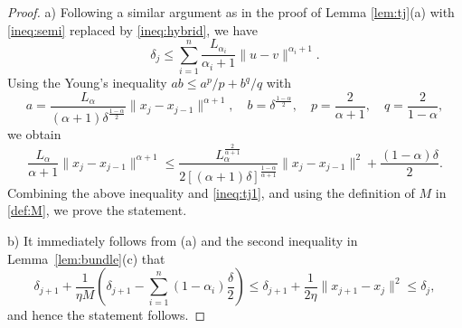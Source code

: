 \documentclass[11pt,letterpaper]{article}
\newtheorem{lemma}[thm]{Lemma}
\newcommand{\R}{\mathbb{R}}
\newcommand{\inner}[2]{\langle #1,#2\rangle}
\begin{document}
\begin{proof}
a) Following a similar argument as in the proof of Lemma \ref{lem:tj}(a) with \eqref{ineq:semi} replaced by \eqref{ineq:hybrid}, we have
\begin{equation}\label{ineq:tj1}
    \delta_j \le \sum_{i=1}^n \frac{L_{\alpha_i}}{\alpha_i+1} \|u-v\|^{\alpha_i+1}.
\end{equation}
Using the Young's inequality $ab\le a^p/p + b^q/q$ with 
	\[
	a = \frac{L_\alpha}{(\alpha+1)\delta^{\frac{1-\alpha}{2}}}\|x_j-x_{j-1}\|^{\alpha+1}, \quad b= \delta^{\frac{1-\alpha}{2}}, \quad p= \frac{2}{\alpha+1}, \quad q= \frac{2}{1-\alpha}, 
	\]
	we obtain
	\[
	\frac{L_\alpha}{\alpha+1}\|x_j-x_{j-1}\|^{\alpha+1} \le
	\frac{L_\alpha^{\frac{2}{\alpha+1}} }{2 [(\alpha+1)\delta]^{\frac{1-\alpha}{\alpha+1}} }\|x_j-x_{j-1}\|^2
	+ \frac{(1-\alpha)\delta}{2}.
	\]
Combining the above inequality and \eqref{ineq:tj1}, and using the definition of $M$ in \eqref{def:M}, we prove the statement.

b) It immediately follows from (a) and the second inequality in Lemma~\ref{lem:bundle}(c) that
    \[
    \delta_{j+1} + \frac{1}{\eta M}\left(\delta_{j+1}-\sum_{i=1}^n(1-\alpha_i) \frac{\delta}{2}\right) \le \delta_{j+1} + \frac{1}{2\eta}\|x_{j+1}-x_j\|^2 \le \delta_j,
    \]
    and hence the statement follows.
\end{proof}






    
\end{document}
